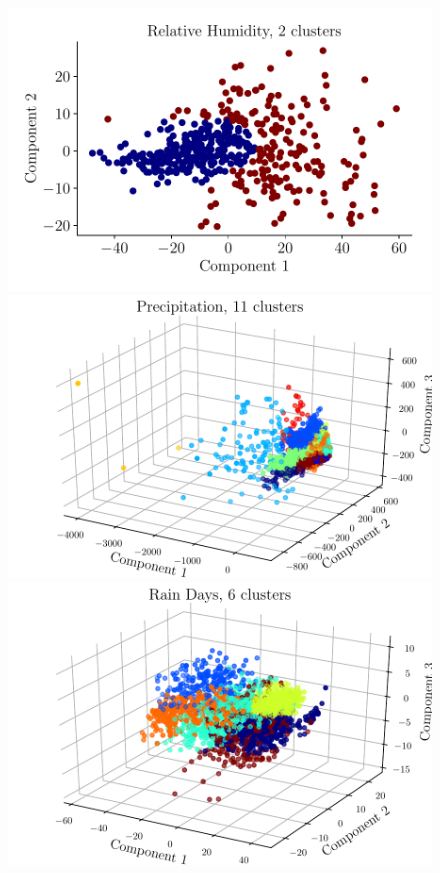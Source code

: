 \documentclass[a4paper,fleqn,usenatbib]{mnras}
\begin{document}
\begin{figure}
\begin{center}
\includegraphics[scale=0.5]{ldeh.pdf}
\includegraphics[scale=0.5]{ldel.pdf}
\includegraphics[scale=0.5]{lded.pdf}

\end{center}
\end{figure}
\end{document}
